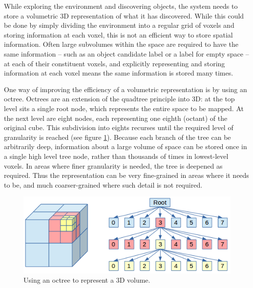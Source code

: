 
While exploring the environment and discovering objects, the system needs to store a volumetric 3D representation of what it has discovered.
While this could be done by simply dividing the environment into a regular grid of voxels and storing information at each voxel, this is not an efficient way to store spatial information.
Often large subvolumes within the space are required to have the same information -- such as an object candidate label or a label for empty space -- at each of their constituent voxels, and explicitly representing and storing information at each voxel means the same information is stored many times.

One way of improving the efficiency of a volumetric representation is by using an octree\cite{meagher1982octrees}.
Octrees are an extension of the quadtree principle into 3D: at the top level sits a single root node, which represents the entire space to be mapped.
At the next level are eight nodes, each representing one eighth (octant) of the original cube.
This subdivision into eights recurses until the required level of granularity is reached (see figure \ref{fig:octree}).
Because each branch of the tree can be arbitrarily deep, information about a large volume of space can be stored once in a single high level tree node, rather than thousands of times in lowest-level voxels.
In areas where finer granularity is needed, the tree is deepened as required.
Thus the representation can be very fine-grained in areas where it needs to be, and much coarser-grained where such detail is not required.

\begin{figure}[ht]
	\begin{center}
		\includegraphics[width=0.6\linewidth]{src/octree.png} 
		\caption[Using an octree to represent a 3D volume]{Using an octree to represent a 3D volume.\footnotemark}
		\label{fig:octree}
	\end{center}
\end{figure}
